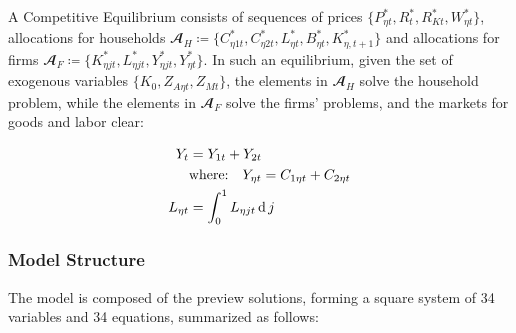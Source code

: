\documentclass[../thesis.tex]{subfiles}
\begin{document}
A Competitive Equilibrium consists of sequences of prices $\{P_{\eta t}^{\ast}, R_t^{\ast}, R_{Kt}^{\ast}, W_{\eta t}^{\ast}\}$, allocations for households $\mathbfscr{A}_H \coloneq \{C_{\eta 1 t}^{\ast}, C_{\eta 2 t}^{\ast}, L_{\eta t}^{\ast}, B_{\eta t}^{\ast}, K_{\eta, t+1}^{\ast}\}$ and allocations  for firms $\mathbfscr{A}_F \coloneq \{K_{\eta jt}^{\ast}, L_{\eta jt}^{\ast}, Y_{\eta jt}^{\ast}, Y_{\eta t}^{\ast}\}$. In such an equilibrium, given the set of exogenous variables $\{K_0, Z_{A\eta t}, Z_{Mt}\}$, the elements in $\mathbfscr{A}_H$ solve the household problem, while the elements in $\mathbfscr{A}_F$ solve the firms' problems, and the markets for goods and labor clear:
\begin{tcolorbox}[colback=red!5!white,colframe=red!75!black]
	
	\begin{align}
		Y_{t} &= Y_{1 t} + Y_{2 t} \label{eq_v5:reg-market-clearing-condition-Yt} \\
		& \text{where:} \quad Y_{\eta t} = C_{1 \eta t} + C_{2 \eta t} \label{eq_v5:reg-regional-demand} \\
		L_{\eta t} &= \int_{0}^{1} L_{\eta jt} \operatorname{d} j \label{eq_v5:reg-market-clearing-condition-Lt}
	\end{align}
	
\end{tcolorbox}

\begin{comment}

\begin{align}
	& \text{where:} \quad Y_{\eta t} = C_{\eta 1 t} + C_{\eta 2 t} + I_{\eta t} %
	L_{\eta t} &= \int_{0}^{1} L_{\eta jt} \dif j %
\end{align}

\end{comment}

\newpage


\subsubsection{Model Structure}

The model is composed of the preview solutions, forming a square system of 34 variables and 34 equations, summarized as follows:
\end{document}
